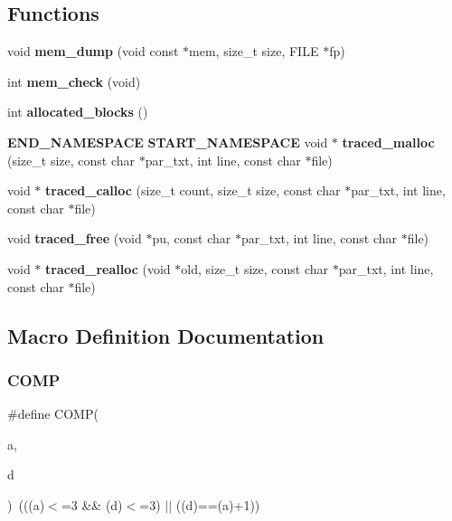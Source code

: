 \subsection*{Functions}
\begin{DoxyCompactItemize}
\item 
void \textbf{ mem\+\_\+dump} (void const $\ast$mem, size\+\_\+t size, F\+I\+LE $\ast$fp)
\item 
int \textbf{ mem\+\_\+check} (void)
\item 
int \textbf{ allocated\+\_\+blocks} ()
\item 
\textbf{ E\+N\+D\+\_\+\+N\+A\+M\+E\+S\+P\+A\+CE} \textbf{ S\+T\+A\+R\+T\+\_\+\+N\+A\+M\+E\+S\+P\+A\+CE} void $\ast$ \textbf{ traced\+\_\+malloc} (size\+\_\+t size, const char $\ast$par\+\_\+txt, int line, const char $\ast$file)
\item 
void $\ast$ \textbf{ traced\+\_\+calloc} (size\+\_\+t count, size\+\_\+t size, const char $\ast$par\+\_\+txt, int line, const char $\ast$file)
\item 
void \textbf{ traced\+\_\+free} (void $\ast$pu, const char $\ast$par\+\_\+txt, int line, const char $\ast$file)
\item 
void $\ast$ \textbf{ traced\+\_\+realloc} (void $\ast$old, size\+\_\+t size, const char $\ast$par\+\_\+txt, int line, const char $\ast$file)
\end{DoxyCompactItemize}


\subsection{Macro Definition Documentation}
\mbox{\label{memtrace_8cpp_aaed1b7df4f99525f21eda754cf7fae05}} 
\subsubsection{C\+O\+MP}
{\footnotesize\ttfamily \#define C\+O\+MP(\begin{DoxyParamCaption}\item[{}]{a,  }\item[{}]{d }\end{DoxyParamCaption})~(((a)$<$=3 \&\& (d)$<$=3) $\vert$$\vert$ ((d)==(a)+1))}

\mbox{\label{memtrace_8cpp_af6fff8cbc37157865d4b383dacfd947b}} 
